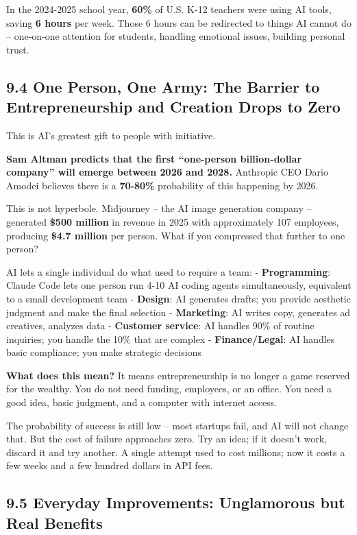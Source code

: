 In the 2024-2025 school year, \textbf{60\%} of U.S. K-12 teachers were
using AI tools, saving \textbf{6 hours} per week. Those 6 hours can be
redirected to things AI cannot do -- one-on-one attention for students,
handling emotional issues, building personal trust.

\subsection{9.4 One Person, One Army: The Barrier to Entrepreneurship
and Creation Drops to
Zero}\label{one-person-one-army-the-barrier-to-entrepreneurship-and-creation-drops-to-zero}

This is AI's greatest gift to people with initiative.

\textbf{Sam Altman predicts that the first ``one-person billion-dollar
company'' will emerge between 2026 and 2028.} Anthropic CEO Dario Amodei
believes there is a \textbf{70-80\%} probability of this happening by
2026.

This is not hyperbole. Midjourney -- the AI image generation company --
generated \textbf{\$500 million} in revenue in 2025 with approximately
107 employees, producing \textbf{\$4.7 million} per person. What if you
compressed that further to one person?

AI lets a single individual do what used to require a team: -
\textbf{Programming}: Claude Code lets one person run 4-10 AI coding
agents simultaneously, equivalent to a small development team -
\textbf{Design}: AI generates drafts; you provide aesthetic judgment and
make the final selection - \textbf{Marketing}: AI writes copy, generates
ad creatives, analyzes data - \textbf{Customer service}: AI handles 90\%
of routine inquiries; you handle the 10\% that are complex -
\textbf{Finance/Legal}: AI handles basic compliance; you make strategic
decisions

\textbf{What does this mean?} It means entrepreneurship is no longer a
game reserved for the wealthy. You do not need funding, employees, or an
office. You need a good idea, basic judgment, and a computer with
internet access.

The probability of success is still low -- most startups fail, and AI
will not change that. But the cost of failure approaches zero. Try an
idea; if it doesn't work, discard it and try another. A single attempt
used to cost millions; now it costs a few weeks and a few hundred
dollars in API fees.

\subsection{9.5 Everyday Improvements: Unglamorous but Real
Benefits}\label{everyday-improvements-unglamorous-but-real-benefits}

